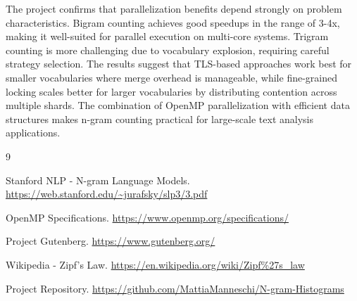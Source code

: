 \documentclass[10pt,twocolumn,letterpaper]{article}
\begin{document}
The project confirms that parallelization benefits depend strongly on problem characteristics. Bigram counting achieves good speedups in the range of 3-4x, making it well-suited for parallel execution on multi-core systems. Trigram counting is more challenging due to vocabulary explosion, requiring careful strategy selection. The results suggest that TLS-based approaches work best for smaller vocabularies where merge overhead is manageable, while fine-grained locking scales better for larger vocabularies by distributing contention across multiple shards. The combination of OpenMP parallelization with efficient data structures makes n-gram counting practical for large-scale text analysis applications.

\begin{thebibliography}{9}

Stanford NLP - N-gram Language Models.
\url{https://web.stanford.edu/~jurafsky/slp3/3.pdf}

OpenMP Specifications.
\url{https://www.openmp.org/specifications/}

Project Gutenberg.
\url{https://www.gutenberg.org/}

Wikipedia - Zipf's Law.
\url{https://en.wikipedia.org/wiki/Zipf%27s_law}

Project Repository.
\url{https://github.com/MattiaManneschi/N-gram-Histograms}

\end{thebibliography}
\end{document}
